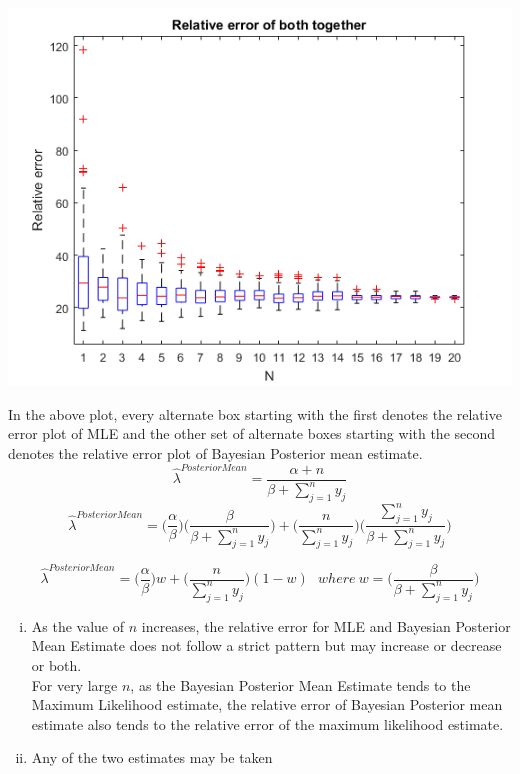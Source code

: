 \documentclass{article}
\begin{document}
\begin{enumerate}
\begin{center}
		\includegraphics[scale=0.8]{p2_both} \\
	\end{center}
	In the above plot, every alternate box starting with the first denotes the relative error plot of MLE and the other set of alternate boxes starting with the second denotes the relative error plot of Bayesian Posterior mean estimate.
	$$  \hat{\lambda}^{PosteriorMean} = \frac{\alpha + n}{\beta + \sum_{j=1}^{n} y_j}$$
	$$ \hat{\lambda}^{PosteriorMean} = \Big(\frac{\alpha}{\beta}\Big) \Big(\frac{\beta}{\beta + \sum_{j=1}^{n} y_j}\Big) + \Big(\frac{n}{\sum_{j=1}^{n} y_j}\Big) \Big(\frac{\sum_{j=1}^{n} y_j}{\beta + \sum_{j=1}^{n} y_j}\Big)$$
	
	$$\hat{\lambda}^{PosteriorMean} = \Big(\frac{\alpha}{\beta}\Big) w + \Big(\frac{n}{\sum_{j=1}^{n} y_j}\Big) (1-w) \ \ \ where \ w = \Big(\frac{\beta}{\beta + \sum_{j=1}^{n} y_j}\Big)$$
	
	\begin{enumerate}[(i)]
		\item As the value of $n$ increases, the     relative error for MLE and Bayesian Posterior Mean Estimate does not follow a strict pattern but may increase or decrease or both.\\
		For very large $n$, as the Bayesian Posterior Mean Estimate tends to the Maximum Likelihood estimate, the relative error of Bayesian Posterior mean estimate also tends to the relative error of the maximum likelihood estimate.
		\item Any of the two estimates may be taken 
	\end{enumerate}
\end{enumerate} 
\end{document}
